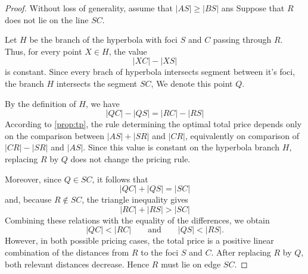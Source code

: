 \documentclass[openany]{book}
\begin{document}
	\begin{proof}
		Without loss of generality, assume that \(|AS|\geq |BS|\) ans Suppose that
		\(R\) does not lie on the line \(SC\).
		
		Let \(H\) be the branch of the hyperbola with foci \(S\) and \(C\) passing
		through \(R\). Thus, for every point \(X\in H\), the value
		\[
		|XC|-|XS|
		\]
		is constant. Since every brach of hyperbola intersects segment between it's foci, the branch \(H\) intersects the segment
		\(SC\), We denote this point \(Q\).
		
		By the definition of \(H\), we have
		\[
		|QC|-|QS| = |RC|-|RS|
		\]
		According to \cref{prop:tp}, the rule determining the optimal total
		price depends only on the comparison between \(|AS|+|SR|\) and \(|CR|\),
		equivalently on comparison of \(|CR|-|SR|\) and \(|AS|\). Since this value is constant on
		the hyperbola branch \(H\), replacing \(R\) by \(Q\) does not change the pricing rule.
		
		Moreover, since \(Q\in SC\), it follows that
		\[
		|QC|+|QS| = |SC|
		\]
		and, because \(R\notin SC\), the triangle inequality gives
		\[
		|RC|+|RS| > |SC|
		\]
		Combining these relations with the equality of the differences, we obtain
		\[
		|QC|<|RC|
		\qquad\text{and}\qquad
		|QS|<|RS|.
		\]	
		However, in both possible pricing cases, the total price is a positive linear
		combination of the distances from \(R\) to the foci \(S\)
		and \(C\). After replacing \(R\) by \(Q\), both relevant distances decrease.
		Hence \(R\) must lie on edge \(SC\).
	\end{proof}
\end{document}
